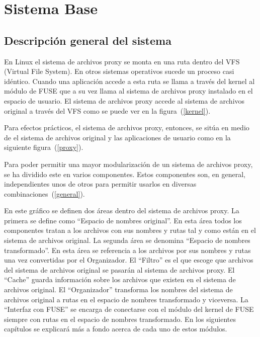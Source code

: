 \chapter{Sistema Base}
\ifpdf
    \graphicspath{{Chapter2/Chapter2Figs/PNG/}{Chapter2/Chapter2Figs/PDF/}{Chapter2/Chapter2Figs/}}
\else
    \graphicspath{{Chapter2/Chapter2Figs/EPS/}{Chapter2/Chapter2Figs/}}
\fi

\section{Descripción general del sistema}

En Linux el sistema de archivos proxy se monta en una ruta dentro del VFS (Virtual File System). En otros sistemas operativos sucede un proceso casi idéntico. Cuando una aplicación accede a esta ruta se llama a través del kernel al módulo de FUSE que a su vez llama al sistema de archivos proxy instalado en el espacio de usuario. El sistema de archivos proxy accede al sistema de archivos original a través del VFS como se puede ver en la figura~(\ref{kernel}).


Para efectos prácticos, el sistema de archivos proxy, entonces, se sitúa en medio de el sistema de archivos original y las aplicaciones de usuario como en la siguiente figura~(\ref{proxy}).


Para poder permitir una mayor modularización de un sistema de archivos proxy, se ha dividido este en varios componentes. Estos componentes son, en general, independientes unos de otros para permitir usarlos en diversas combinaciones~(\ref{general}).


En este gráfico se definen dos áreas dentro del sistema de archivos proxy. La primera se define como ``Espacio de nombres original''. En esta área todos los componentes tratan a los archivos con sus nombres y rutas tal y como están en el sistema de archivos original. La segunda área se denomina ``Espacio de nombres transformado''. En esta área se referencia a los archivos por sus nombres y rutas una vez convertidas por el Organizador. El ``Filtro'' es el que escoge que archivos del sistema de archivos original se pasarán al sistema de archivos proxy. El ``Cache'' guarda información sobre los archivos que existen en el sistema de archivos original. El ``Organizador'' transforma los nombres del sistema de archivos original a rutas en el espacio de nombres transformado y viceversa. La ``Interfaz con FUSE'' se encarga de conectarse con el módulo del kernel de FUSE siempre con rutas en el espacio de nombres transformado. En los siguientes capítulos se explicará más a fondo acerca de cada uno de estos módulos.

